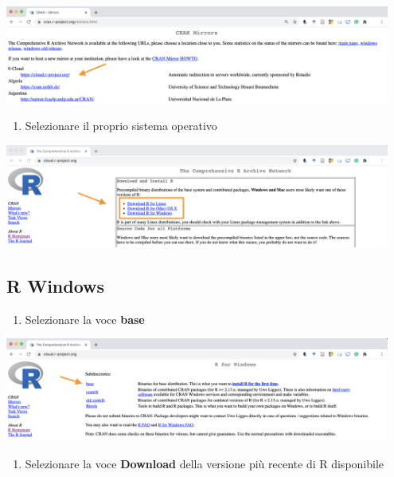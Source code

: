 \documentclass[
]{book}
\providecommand{\tightlist}{%
  \setlength{\itemsep}{0pt}\setlength{\parskip}{0pt}}
\begin{document}
\includegraphics[width=0.95\textwidth,height=\textheight]{images/install_mirror.png}

\begin{enumerate}
\def\labelenumi{\arabic{enumi}.}
\setcounter{enumi}{3}
\tightlist
\item
  Selezionare il proprio sistema operativo
\end{enumerate}

\includegraphics[width=0.95\textwidth,height=\textheight]{images/install_OS.png}

\hypertarget{r-windows}{%
\subsection{R Windows}\label{r-windows}}

\begin{enumerate}
\def\labelenumi{\arabic{enumi}.}
\tightlist
\item
  Selezionare la voce \textbf{base}
\end{enumerate}

\includegraphics[width=0.95\textwidth,height=\textheight]{images/install-Windows-base.png}

\begin{enumerate}
\def\labelenumi{\arabic{enumi}.}
\setcounter{enumi}{1}
\tightlist
\item
  Selezionare la voce \textbf{Download} della versione più recente di R disponibile
\end{enumerate}
\end{document}
